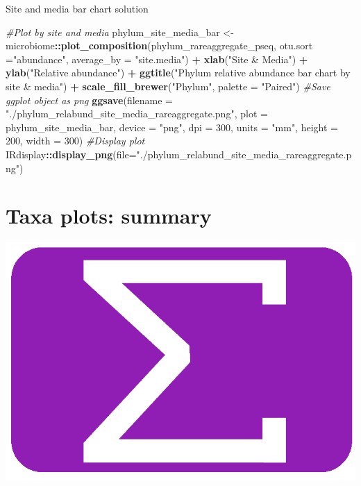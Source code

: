 \documentclass[
]{book}
\newenvironment{Shaded}{\begin{snugshade}}{\end{snugshade}}
\newcommand{\AttributeTok}[1]{\textcolor[rgb]{0.13,0.29,0.53}{#1}}
\newcommand{\CommentTok}[1]{\textcolor[rgb]{0.56,0.35,0.01}{\textit{#1}}}
\newcommand{\DecValTok}[1]{\textcolor[rgb]{0.00,0.00,0.81}{#1}}
\newcommand{\FunctionTok}[1]{\textcolor[rgb]{0.13,0.29,0.53}{\textbf{#1}}}
\newcommand{\NormalTok}[1]{#1}
\newcommand{\OtherTok}[1]{\textcolor[rgb]{0.56,0.35,0.01}{#1}}
\newcommand{\SpecialCharTok}[1]{\textcolor[rgb]{0.81,0.36,0.00}{\textbf{#1}}}
\newcommand{\StringTok}[1]{\textcolor[rgb]{0.31,0.60,0.02}{#1}}
\begin{document}
Site and media bar chart solution

\begin{Shaded}
\begin{Highlighting}[]
\CommentTok{\#Plot by site and media}
\NormalTok{phylum\_site\_media\_bar }\OtherTok{\textless{}{-}} 
\NormalTok{  microbiome}\SpecialCharTok{::}\FunctionTok{plot\_composition}\NormalTok{(phylum\_rareaggregate\_pseq, }
                               \AttributeTok{otu.sort =}\StringTok{"abundance"}\NormalTok{,}
                               \AttributeTok{average\_by =} \StringTok{"site.media"}\NormalTok{) }\SpecialCharTok{+}
  \FunctionTok{xlab}\NormalTok{(}\StringTok{"Site \& Media"}\NormalTok{) }\SpecialCharTok{+} \FunctionTok{ylab}\NormalTok{(}\StringTok{"Relative abundance"}\NormalTok{) }\SpecialCharTok{+}
  \FunctionTok{ggtitle}\NormalTok{(}\StringTok{"Phylum relative abundance bar chart by site \& media"}\NormalTok{) }\SpecialCharTok{+}
  \FunctionTok{scale\_fill\_brewer}\NormalTok{(}\StringTok{"Phylum"}\NormalTok{, }\AttributeTok{palette =} \StringTok{"Paired"}\NormalTok{)}
\CommentTok{\#Save ggplot object as png}
\FunctionTok{ggsave}\NormalTok{(}\AttributeTok{filename =} \StringTok{"./phylum\_relabund\_site\_media\_rareaggregate.png"}\NormalTok{, }\AttributeTok{plot =}\NormalTok{ phylum\_site\_media\_bar,}
       \AttributeTok{device =} \StringTok{"png"}\NormalTok{, }\AttributeTok{dpi =} \DecValTok{300}\NormalTok{, }\AttributeTok{units =} \StringTok{"mm"}\NormalTok{, }\AttributeTok{height =} \DecValTok{200}\NormalTok{, }\AttributeTok{width =} \DecValTok{300}\NormalTok{)}
\CommentTok{\#Display plot}
\NormalTok{IRdisplay}\SpecialCharTok{::}\FunctionTok{display\_png}\NormalTok{(}\AttributeTok{file=}\StringTok{"./phylum\_relabund\_site\_media\_rareaggregate.png"}\NormalTok{)}
\end{Highlighting}
\end{Shaded}

\hypertarget{taxa-plots-summary}{%
\section{Taxa plots: summary}\label{taxa-plots-summary}}

\includegraphics{figures/sum_purple.png}
\end{document}
